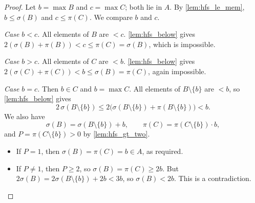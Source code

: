 \documentclass[11pt]{article}
\theoremstyle{definition}
\theoremstyle{remark}
\begin{document}
\begin{proof}
Let $b=\max B$ and $c=\max C$; both lie in $A$. By \cref{lem:hfs_le_mem}, $b\le\sigma(B)$ and $c\le\pi(C)$. We compare $b$ and $c$.

\emph{Case $b<c$.} All elements of $B$ are $<c$. \cref{lem:hfs_below} gives $2(\sigma(B)+\pi(B))<c\le\pi(C)=\sigma(B)$, which is impossible.

\emph{Case $b>c$.} All elements of $C$ are $<b$. \cref{lem:hfs_below} gives $2(\sigma(C)+\pi(C))<b\le\sigma(B)=\pi(C)$, again impossible.

\emph{Case $b=c$.} Then $b\in C$ and $b=\max C$. All elements of $B\setminus\{b\}$ are $<b$, so \cref{lem:hfs_below} gives
\[
2\,\sigma(B\setminus\{b\})\le 2\bigl(\sigma(B\setminus\{b\})+\pi(B\setminus\{b\})\bigr)<b.
\]
We also have
\[
\sigma(B)=\sigma(B\setminus\{b\})+b,\qquad \pi(C)=\pi(C\setminus\{b\})\cdot b,
\]
and $P=\pi(C\setminus\{b\})>0$ by \cref{lem:hfs_gt_two}.
\begin{itemize}
 \item If $P=1$, then $\sigma(B)=\pi(C)=b\in A$, as required.
 \item If $P\ne1$, then $P\ge2$, so $\sigma(B)=\pi(C)\ge2b$. But $2\sigma(B)=2\sigma(B\setminus\{b\})+2b<3b$, so $\sigma(B)<2b$. This is a contradiction.
\end{itemize}
\end{proof}
\end{document}

